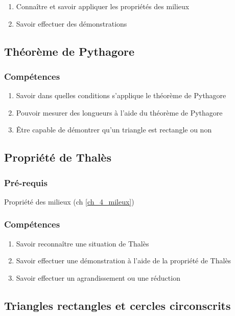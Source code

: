 \begin{enumerate}
	\item Connaître et savoir appliquer les propriétés des milieux
	\item Savoir effectuer des démonstrations
\end{enumerate}

\subsection{Théorème de Pythagore}\label{ch_4_pyth}

\subsubsection*{Compétences}
\begin{enumerate}
	\item Savoir dans quelles conditions s'applique le théorème de Pythagore
	\item Pouvoir mesurer des longueurs à l'aide du théorème de Pythagore
	\item Être capable de démontrer qu'un triangle est rectangle ou non
\end{enumerate}

\subsection{Propriété de Thalès}\label{ch_4_thales}
\subsubsection*{Pré-requis}
	Propriété des milieux (ch \ref{ch_4_mileux})

\subsubsection*{Compétences}
\begin{enumerate}
	\item Savoir reconnaître une situation de Thalès
	\item Savoir effectuer une démonstration à l'aide de la propriété de Thalès
	\item Savoir effectuer un agrandissement ou une réduction
\end{enumerate}

\subsection{Triangles rectangles et cercles circonscrits}\label{ch_4_tr_circ}


